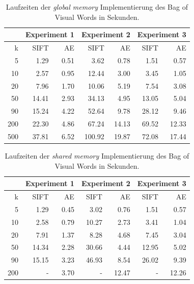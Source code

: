 \begin{table}
    \centering
    \begin{tabular}[t]{|r|r|r|r|r|r|r|}
    \hline
	       & \multicolumn{2}{|c|}{Experiment 1} & \multicolumn{2}{|c|}{Experiment 2} & \multicolumn{2}{|c|}{Experiment 3} \\ \hline
	k    & SIFT  & AE   & SIFT   & AE    & SIFT  & AE    \\ \hline    
    5    &  1.29 & 0.51 &  3.62  &  0.78 &  1.51 &  0.57 \\ \hline
    10   &  2.57 & 0.95 &  12.44 &  3.00 &  3.45 &  1.05 \\ \hline
    20   &  7.96 & 1.70 &  10.06 &  5.19 &  7.54 &  3.08 \\ \hline
    50   & 14.41 & 2.93 &  34.13 &  4.95 & 13.05 &  5.04 \\ \hline
    90   & 15.24 & 4.22 &  52.64 &  9.78 & 28.12 &  9.46 \\ \hline
	200  & 22.30 & 4.86 &  67.24 & 14.13 & 69.52 & 12.33 \\ \hline
	500  & 37.81 & 6.52 & 100.92 & 19.87 & 72.08 & 17.44 \\ \hline
	\end{tabular}
	\caption{Laufzeiten der \textit{global memory} Implementierung des Bag of Visual Words in Sekunden.}
	\label{tab:runtimeGlobal}
\end{table}

\begin{table}
    \centering
    \begin{tabular}[t]{|r|r|r|r|r|r|r|}
    \hline
         & \multicolumn{2}{|c|}{Experiment 1} & \multicolumn{2}{|c|}{Experiment 2} & \multicolumn{2}{|c|}{Experiment 3} \\ \hline
	k    & SIFT  & AE   & SIFT   & AE    & SIFT  & AE    \\ \hline    
    5    &  1.29 & 0.45 &   3.02 &  0.76 &  1.51 &  0.57 \\ \hline
    10   &  2.58 & 0.79 &  10.27 &  2.73 &  3.41 &  1.04 \\ \hline
    20   &  7.91 & 1.37 &   8.28 &  4.68 &  7.45 &  3.04 \\ \hline
    50   & 14.34 & 2.28 &  30.66 &  4.44 & 12.95 &  5.02 \\ \hline
    90   & 15.15 & 3.23 &  46.93 &  8.54 & 26.02 &  9.39 \\ \hline
	200  & 	   - & 3.70 &      - & 12.47 & -     & 12.26 \\ \hline
	\end{tabular}
	\caption{Laufzeiten der \textit{shared memory} Implementierung des Bag of Visual Words in Sekunden.}
	\label{tab:runtimeShared}
\end{table}